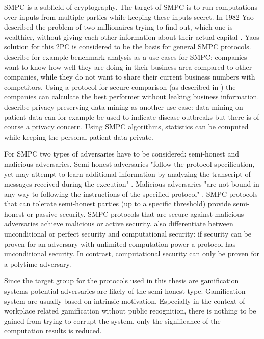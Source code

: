 \gls{SMPC} is a subfield of cryptography. The target of \gls{SMPC} is to run computations over inputs from multiple parties while keeping these inputs secret. In 1982 Yao described the problem of two millionaires trying to find out, which one is wealthier, without giving each other information about their actual capital \autocite{Yao1982}. Yaos solution for this \gls{2PC} is considered to be the basis for general \gls{SMPC} protocols.
\textcite{Cramer2015} describe for example benchmark analysis as a use-cases for \gls{SMPC}: companies want to know how well they are doing in their business area compared to other companies, while they do not want to share their current business numbers with competitors. Using a protocol for secure comparison (as described in ) the companies can calculate the best performer without leaking business information. 
\textcite{Clifton2002} describe privacy preserving data mining as another use-case: data mining on patient data can for example be used to indicate disease outbreaks but there is of course a privacy concern. Using \gls{SMPC} algorithms, statistics can be computed while keeping the personal patient data private.

For \gls{SMPC} two types of adversaries have to be considered: semi-honest and malicious adversaries.
Semi-honest adversaries "follow the protocol specification, yet may attempt to learn additional information by analyzing the transcript of messages received during the execution" \autocite{Aumann2007}. Malicious adversaries "are not bound in any way to following the instructions of the specified protocol" \autocite{Aumann2007}.
\gls{SMPC} protocols that can tolerate semi-honest parties (up to a specific threshold) provide semi-honest or passive security. \gls{SMPC} protocols that are secure against malicious adversaries achieve malicious or active security.
\textcite[p. 82]{Cramer2015} also differentiate between unconditional or perfect security and computational security: if security can be proven for an adversary with unlimited computation power a protocol has unconditional security. In contrast, computational security can only be proven for a polytime adversary.

Since the target group for the protocols used in this thesis are gamification systems potential adversaries are likely of the semi-honest type. Gamification system are usually based on intrinsic motivation. Especially in the context of workplace related gamification without public recognition, there is nothing to be gained from trying to corrupt the system, only the significance of the computation results is reduced.

